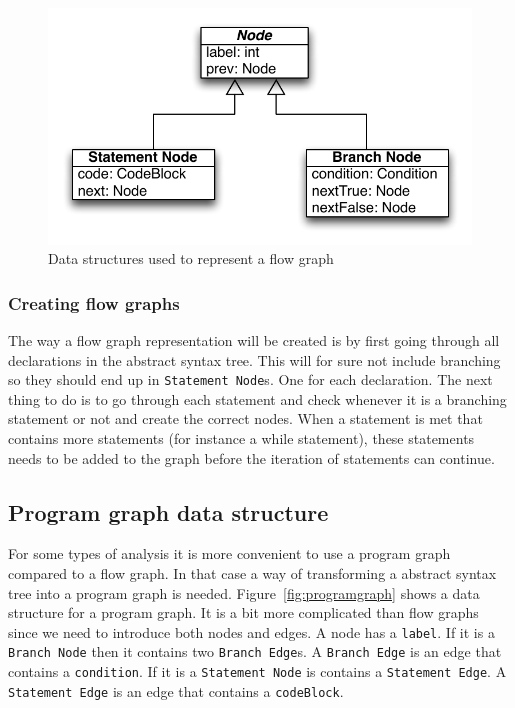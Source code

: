 \begin{figure}[h]
	\centering
	\includegraphics[scale=1.0]{../img/flow_graph}
	\caption{Data structures used to represent a flow graph}
	\label{fig:flowgraph}
\end{figure}

\subsubsection{Creating flow graphs}
The way a flow graph representation will be created is by first going through all declarations in the abstract syntax tree. This will for sure not include branching so they should end up in \texttt{Statement Node}s. One for each declaration. The next thing to do is to go through each statement and check whenever it is a branching statement or not and create the correct nodes. When a statement is met that contains more statements (for instance a while statement), these statements needs to be added to the graph before the iteration of statements can continue.

\subsection{Program graph data structure}
For some types of analysis it is more convenient to use a program graph compared to a flow graph. In that case a way of transforming a abstract syntax tree into a program graph is needed. Figure~\ref{fig:programgraph} shows a data structure for a program graph. It is a bit more complicated than flow graphs since we need to introduce both nodes and edges. A node has a \texttt{label}. If it is a \texttt{Branch Node} then it contains two \texttt{Branch Edge}s. A \texttt{Branch Edge} is an edge that contains a \texttt{condition}. If it is a \texttt{Statement Node} is contains a \texttt{Statement Edge}. A \texttt{Statement Edge} is an edge that contains a \texttt{codeBlock}.

